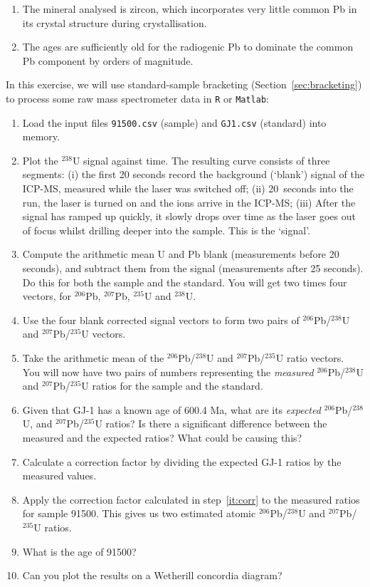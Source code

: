 \documentclass{book}
\begin{document}
\begin{enumerate}
\item The mineral analysed is zircon, which incorporates very little
  common Pb in its crystal structure during crystallisation.
\item The ages are sufficiently old for the radiogenic Pb to dominate
  the common Pb component by orders of magnitude.
\end{enumerate}

In this exercise, we will use standard-sample bracketing
(Section~\ref{sec:bracketing}) to process some raw mass spectrometer
data in \texttt{R} or \texttt{Matlab}:

\begin{enumerate}
\item Load the input files {\tt 91500.csv} (sample) and {\tt GJ1.csv}
  (standard) into memory.
\item Plot the $^{238}$U signal against time. The resulting curve
  consists of three segments: (i) the first 20 seconds record the
  background (`blank') signal of the ICP-MS, measured while the laser
  was switched off; (ii) 20~seconds into the run, the laser is turned
  on and the ions arrive in the ICP-MS; (iii) After the signal has
  ramped up quickly, it slowly drops over time as the laser goes out
  of focus whilst drilling deeper into the sample. This is the
  `signal'.
\item Compute the arithmetic mean U and Pb blank (measurements before
  20 seconds), and subtract them from the signal (measurements after
  25 seconds). Do this for both the sample and the standard.  You will
  get two times four vectors, for $^{206}$Pb, $^{207}$Pb, $^{235}$U
  and $^{238}$U.
\item Use the four blank corrected signal vectors to form two pairs of
  $^{206}$Pb/$^{238}$U and $^{207}$Pb/$^{235}$U vectors.
\item Take the arithmetic mean of the $^{206}$Pb/$^{238}$U and
  $^{207}$Pb/$^{235}$U ratio vectors. You will now have two pairs of
  numbers representing the \emph{measured} $^{206}$Pb/$^{238}$U and
  $^{207}$Pb/$^{235}$U ratios for the sample and the standard.
\item Given that GJ-1 has a known age of 600.4 Ma, what are its
  \emph{expected} $^{206}$Pb/$^{238}$U, and $^{207}$Pb/$^{235}$U
  ratios? Is there a significant difference between the measured and
  the expected ratios? What could be causing this?
\item\label{it:corr} Calculate a correction factor by dividing the
  expected GJ-1 ratios by the measured values.
\item\label{it:atomicUPb} Apply the correction factor calculated in
  step~\ref{it:corr} to the measured ratios for sample 91500. This
  gives us two estimated atomic $^{206}$Pb/$^{238}$U and
  $^{207}$Pb/$^{235}$U ratios.
\item What is the age of 91500?
\item Can you plot the results on a Wetherill concordia diagram?
\end{enumerate}
\end{document}

